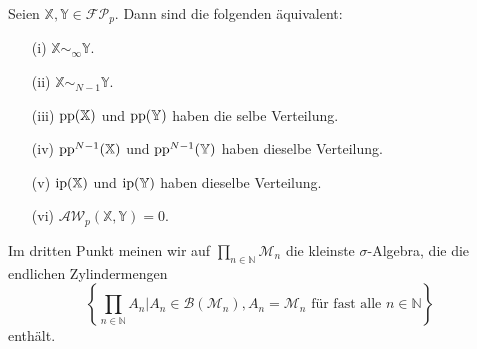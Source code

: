     \begin{theorem}
        Seien $\mathbb{X,Y} \in \mathcal{FP}_p$. Dann sind die folgenden äquivalent:

        \begin{enumerate}
            \item[(i)] $\mathbb{X} \sim_\infty \mathbb{Y}$.
            \item[(ii)] $\mathbb{X} \sim_{N-1} \mathbb{Y}$.
            \item[(iii)] $\operatorname{pp}(\mathbb{X})$ und $\operatorname{pp}(\mathbb{Y})$ haben die selbe Verteilung.
            \item[(iv)] $\operatorname{pp}^{N-1}(\mathbb{X})$ und $\operatorname{pp}^{N-1}(\mathbb{Y})$ haben dieselbe Verteilung.
            \item[(v)] $\operatorname{ip}(\mathbb{X})$ und $\operatorname{ip}(\mathbb{Y})$ haben dieselbe Verteilung.
            \item[(vi)] $\mathcal{AW}_p(\mathbb{X}, \mathbb{Y})=0$.
        \end{enumerate}
        Im dritten Punkt meinen wir auf $\prod_{n \in \mathbb{N}} \mathcal{M}_n$ die kleinste $\sigma$-Algebra, die die endlichen Zylindermengen
        $$\left\{ \prod_{n\in\mathbb{N}} A_n \vert A_n \in \mathcal{B}(\mathcal{M}_n), A_n = \mathcal{M}_n \text{ für fast alle } n \in \mathbb{N}\right\}$$
        enthält.
    \end{theorem}
